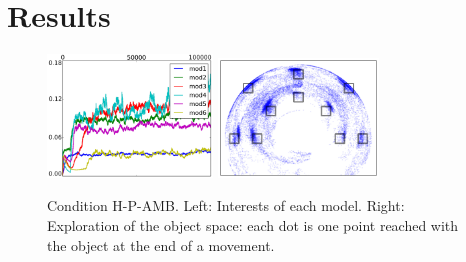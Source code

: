 \documentclass[10pt,letterpaper]{article}
\begin{document}
	
%


\section{Results}
	
	\begin{figure}[t]
		\centering
		\hspace{-0.7cm}	
		\vspace{0pt}
		\includegraphics[width=4.4cm]{./include/H-RGB-P-AMB-log9-interests-100000.png}
		\hspace{-0.1cm}	
		\vspace{0pt}
		\includegraphics[width=4.26cm]{./include/obj-explo.pdf}
		\caption{Condition H-P-AMB. Left: Interests of each model. Right: Exploration of the object space: each dot is one point reached with the object at the end of a movement.}
		\label{res_interests}
	\end{figure}
	
\end{document}
